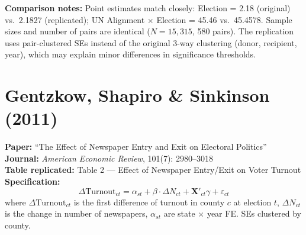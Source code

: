 \documentclass[11pt,a4paper]{article}
\begin{document}
\vspace{1cm}
\textbf{Comparison notes:} Point estimates match closely: Election = 2.18 (original) vs.\ 2.1827 (replicated); UN Alignment $\times$ Election = 45.46 vs.\ 45.4578. Sample sizes and number of pairs are identical ($N = 15{,}315$, 580 pairs). The replication uses pair-clustered SEs instead of the original 3-way clustering (donor, recipient, year), which may explain minor differences in significance thresholds.

\newpage

\section{Gentzkow, Shapiro \& Sinkinson (2011)}

\textbf{Paper:} ``The Effect of Newspaper Entry and Exit on Electoral Politics''\\
\textbf{Journal:} \textit{American Economic Review}, 101(7): 2980--3018\\
\textbf{Table replicated:} Table 2 --- Effect of Newspaper Entry/Exit on Voter Turnout\\
\textbf{Specification:}
\[
\Delta \text{Turnout}_{ct} = \alpha_{st} + \beta \cdot \Delta N_{ct} + \mathbf{X}'_{ct}\gamma + \varepsilon_{ct}
\]
where $\Delta \text{Turnout}_{ct}$ is the first difference of turnout in county $c$ at election $t$, $\Delta N_{ct}$ is the change in number of newspapers, $\alpha_{st}$ are state $\times$ year FE. SEs clustered by county.

\vspace{0.3cm}
\noindent{}
\end{document}
